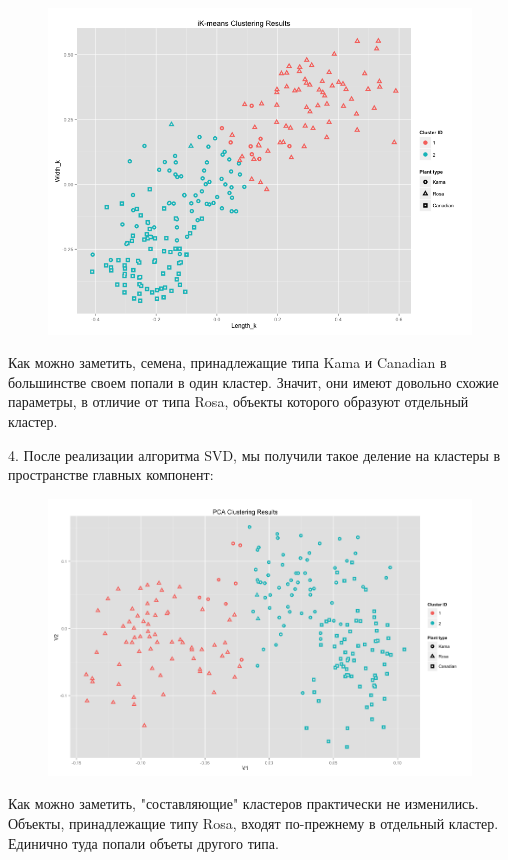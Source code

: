 \documentclass{article}
\begin{document}
\begin{figure}[H] 
\centering
\includegraphics[scale=0.55]{img/6_ikmeans_length_width.png}
\label{fig :metka1}
\end{figure}

Как можно заметить, семена, принадлежащие типа Kama и Canadian в большинстве своем попали в один кластер. Значит, они имеют довольно схожие параметры, в отличие от типа Rosa, объекты которого образуют отдельный кластер.

\bigskip

4. После реализации алгоритма SVD, мы получили такое деление на кластеры в пространстве главных компонент:

\begin{figure}[H] 
\centering
\includegraphics[scale = 0.55]{img/6_pcaplot.png}
\label{fig :metka1}
\end{figure}

Как можно заметить, "составляющие" кластеров практически не изменились. Объекты, принадлежащие типу Rosa, входят по-прежнему в отдельный кластер. Единично туда попали объеты другого типа. 
\end{document}
